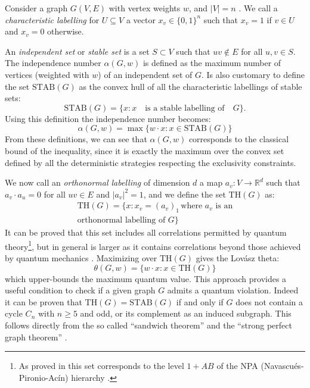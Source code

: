 \documentclass[letterpaper]{article}
\newcommand{\Real}{\mathbb{R}}
\newcommand{\STAB}{\mathrm{STAB}}
\renewcommand{\TH}{\mathrm{TH}}
\begin{document}
Consider a graph $G(V,E)$ with vertex weights $w$, and $|V| = n$ .
We call a \emph{characteristic labelling} for $U \subseteq V$ a vector $x_v \in
\{0,1\}^n$ such that $x_v = 1$ if $v \in U$ and $x_v = 0$ otherwise.

An \emph{independent set} or \emph{stable set} is a set
$S \subset V$ such that $uv \notin E$ for all $u,v \in S$.
The independence number $\alpha(G, w)$ is defined as the maximum number of vertices (weighted with $w$) of an independent set of $G$. Is also customary to define the set $\STAB(G)$ as the convex hull of all the
characteristic labellings of stable sets:
\begin{equation} 
    \STAB(G) = \{x : x \quad \text{is a stable labelling of}\quad G \}.
    \label{eq:stab}
\end{equation}
Using this definition the independence number becomes:
\begin{equation}
    \alpha(G,w) = \max\{w\cdot x: x \in \STAB(G)\}
    \label{eq:alphastab}
\end{equation}
From these definitions, we can see that $\alpha(G,w)$ corresponds to the classical bound of the inequality, since it is exactly the maximum over the convex set defined by all the deterministic strategies respecting the exclusivity constraints.

We now call an \emph{orthonormal labelling} of dimension $d$ a map
$a_v:V \rightarrow \Real^d$ such that $a_v \cdot a_u = 0$ for all $uv \in E$ and
$|a_v|^2 = 1$, and we define the set $\TH(G)$ as:
\begin{multline}
    \TH(G) = \{x: x_v = (a_v)_1 \, \text{where $a_v$ is an} \\ \text{orthonormal labelling of $G$}\}
    \label{eq:thbody}
\end{multline}
It can be proved that this set includes all correlations permitted by quantum
theory\footnote{As proved in \cite{acin2015} this set corresponds to the level
$1+AB$ of the NPA (Navascués-Pironio-Acín) hierarchy \cite{npa2008}.}, %
but in general is larger as it contains correlations beyond those achieved by quantum
mechanics \cite{almostquantum2015}.
Maximizing over $\TH(G)$ gives the Lovász theta:
\begin{equation}
    \theta(G,w) = \{w\cdot x : x \in \TH(G)\}
    \label{eq:lovasztheta}
\end{equation}
which upper-bounds the maximum quantum value.
This approach provides a useful condition to check if a given graph $G$ admits a
quantum violation. Indeed it can be proven that $\TH(G) = \STAB(G)$ if and only
if $G$ does not contain a cycle $C_n$ with $n \ge 5$ and odd, or its complement
as an induced subgraph. This follows directly from the so called ``sandwich
theorem'' and the ``strong perfect graph theorem'' \cite{knuth}.
\end{document}

